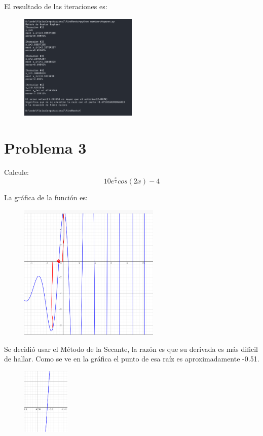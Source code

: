 \documentclass[a4paper,12pt]{article}
\begin{document}
    El resultado de las iteraciones es:
    \begin{figure}[h]
        \centering
        \includegraphics[width=0.5\textwidth]{f2console.PNG}
    \end{figure}
    \newpage
    \section{Problema 3}
    Calcule:
    \begin{equation}
        10e^{\frac{x}{2}}cos(2x)-4
    \end{equation}

    La gráfica de la función es:
    \begin{figure}[h]
        \centering
        \includegraphics[width=0.6\textwidth]{f3.PNG}
    \end{figure}

    Se decidió usar 
    el Método de la Secante, la razón es que su derivada es más dificil 
    de hallar.
    Como se ve en la gráfica el punto de esa raíz es aproximadamente -0.51.
    \begin{figure}[h]
        \centering
        \includegraphics[width=0.2\textwidth]{f3_2.PNG}
    \end{figure}
\end{document}
